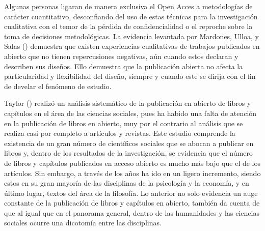 \documentclass[
  spanish,
  a4paper,
  oneside]{scrbook}
\begin{document}
Algunas personas ligaran de manera exclusiva el Open Acces a
metodologías de carácter cuantitativo, desconfiando del uso de estas
técnicas para la investigación cualitativa con el temor de la pérdida de
confidencialidad o el reproche sobre la toma de decisiones
metodológicas. La evidencia levantada por Mardones, Ulloa, y Salas
() demuestra que existen
experiencias cualitativas de trabajos publicados en abierto que no
tienen repercusiones negativas, aún cuando estos declaran y describen
sus diseños. Ello demuestra que la publicación abierta no afecta la
particularidad y flexibilidad del diseño, siempre y cuando este se
dirija con el fin de develar el fenómeno de estudio.

Taylor () realizó un análisis
sistemático de la publicación en abierto de libros y capítulos en el
área de las ciencias sociales, pues ha habido una falta de atención en
la publicación de libros en abierto, muy por el contrario al análisis
que se realiza casi por completo a artículos y revistas. Este estudio
comprende la existencia de un gran número de científicos sociales que se
abocan a publicar en libros y, dentro de los resultados de la
investigación, se evidencia que el número de libros y capítulos
publicados en acceso abierto es mucho más bajo que el de los artículos.
Sin embargo, a través de los años ha ido en un ligero incremento, siendo
estos en su gran mayoría de las disciplinas de la psicología y la
economía, y en último lugar, textos del área de la filosofía. Lo
anterior no solo evidencia un auge constante de la publicación de libros
y capítulos en abierto, también da cuenta de que al igual que en el
panorama general, dentro de las humanidades y las ciencias sociales
ocurre una dicotomía entre las disciplinas.
\end{document}
